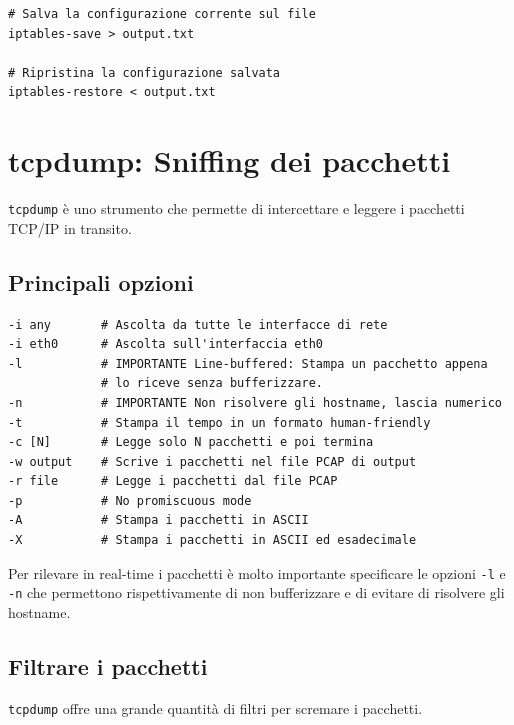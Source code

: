 \documentclass[a4paper]{report}
\newenvironment{ricordati}{\begin{tcolorbox}[fonttitle=\sffamily\bfseries\large,title=Ricordati,colframe=orange!75!white]}{\end{tcolorbox}}
\newenvironment{code}{\begin{tcolorbox}[size=small]}{\end{tcolorbox}}
\begin{document}
\begin{code}
\begin{lstlisting}
# Salva la configurazione corrente sul file
iptables-save > output.txt

# Ripristina la configurazione salvata
iptables-restore < output.txt
\end{lstlisting}
\end{code}
	
\chapter{tcpdump: Sniffing dei pacchetti}
\label{chap:tcpdump}

\texttt{tcpdump} è uno strumento che permette di intercettare e leggere i pacchetti TCP/IP in transito.

\section{Principali opzioni}
\begin{code}
\begin{lstlisting}
-i any       # Ascolta da tutte le interfacce di rete
-i eth0      # Ascolta sull'interfaccia eth0
-l           # IMPORTANTE Line-buffered: Stampa un pacchetto appena 
             # lo riceve senza bufferizzare. 
-n           # IMPORTANTE Non risolvere gli hostname, lascia numerico
-t           # Stampa il tempo in un formato human-friendly
-c [N]       # Legge solo N pacchetti e poi termina
-w output    # Scrive i pacchetti nel file PCAP di output
-r file      # Legge i pacchetti dal file PCAP
-p           # No promiscuous mode
-A           # Stampa i pacchetti in ASCII
-X           # Stampa i pacchetti in ASCII ed esadecimale
\end{lstlisting}
\end{code}

\begin{ricordati}
	Per rilevare in real-time i pacchetti è molto importante specificare le opzioni \texttt{-l} e \texttt{-n} che permettono rispettivamente di non bufferizzare e di evitare di risolvere gli hostname.
\end{ricordati}

\section{Filtrare i pacchetti}

\texttt{tcpdump} offre una grande quantità di filtri per scremare i pacchetti.
\end{document}
